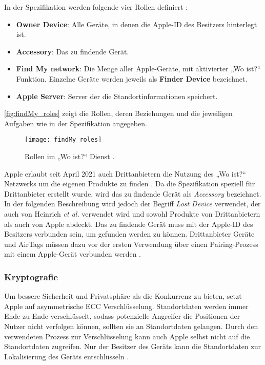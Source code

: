 In der Spezifikation werden folgende vier Rollen definiert \cite{Apple_FindMySpec}:
\begin{itemize}
    \item \textbf{Owner Device}: Alle Geräte, in denen die Apple-ID des Besitzers hinterlegt ist.
    \item \textbf{Accessory}: Das zu findende Gerät.
    \item \textbf{Find My network}: Die Menge aller Apple-Geräte, mit aktivierter „Wo ist?“ Funktion. Einzelne Geräte werden jeweils als \textbf{Finder Device} bezeichnet.
    \item \textbf{Apple Server}: Server der die Standortinformationen speichert.
\end{itemize}
\autoref{fig:findMy_roles} zeigt die Rollen, deren Beziehungen und die jeweiligen Aufgaben wie in der Spezifikation angegeben.
\begin{figure}
    \centering
    \texttt{[image: findMy\_roles]}
    \caption{Rollen im „Wo ist?“ Dienst \cite{Apple_FindMySpec}.}
    \label{fig:findMy_roles}
\end{figure}
Apple erlaubt seit April 2021 auch Drittanbietern die Nutzung des „Wo ist?“ Netzwerks um die eigenen Produkte zu finden \cite{Apple_FindMy3rdParty}.
Da die Spezifikation speziell für Drittanbieter erstellt wurde, wird das zu findende Gerät als \textit{Accessory} bezeichnet.
In der folgenden Beschreibung wird jedoch der Begriff \textit{Lost Device} verwendet, der auch von Heinrich \textit{et al.} \cite{Heinrich_FindMy} verwendet wird und sowohl Produkte von Drittanbietern als auch von Apple abdeckt.
Das zu findende Gerät muss mit der Apple-ID des Besitzers verbunden sein, um gefunden werden zu können.
Drittanbieter Geräte und AirTags müssen dazu vor der ersten Verwendung über einen Pairing-Prozess mit einem Apple-Gerät verbunden werden \cite{Apple_FindMySpec}.

\subsubsection{Kryptografie}
\label{sec:Kryptografie}

Um bessere Sicherheit und Privatsphäre als die Konkurrenz zu bieten, setzt Apple auf asymmetrische \ac{ECC} Verschlüsselung.
Standortdaten werden immer Ende-zu-Ende verschlüsselt, sodass potenzielle Angreifer die Positionen der Nutzer nicht verfolgen können, sollten sie an Standortdaten gelangen.
Durch den verwendeten Prozess zur Verschlüsselung kann auch Apple selbst nicht auf die Standortdaten zugreifen.
Nur der Besitzer des Geräts kann die Standortdaten zur Lokalisierung des Geräts entschlüsseln \cite{Greenberg_FindMyCrypto}.


